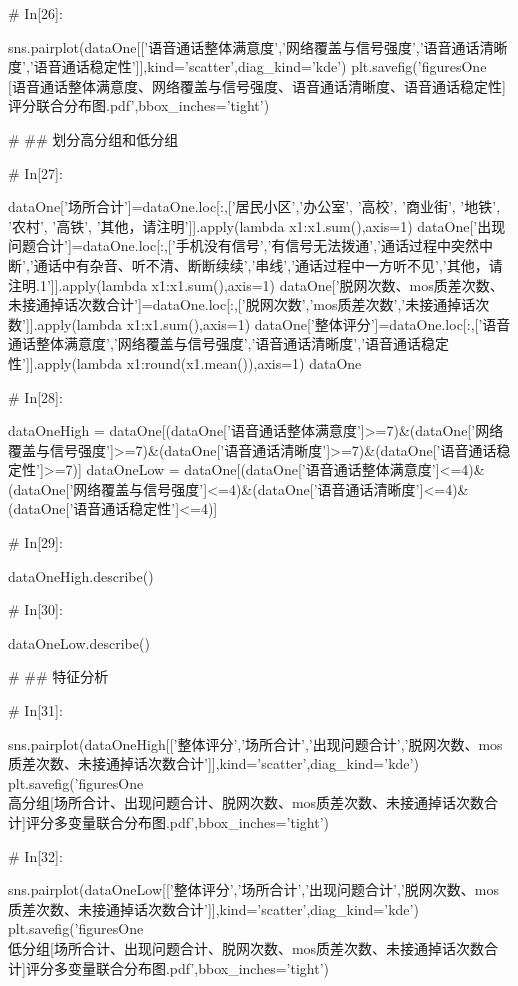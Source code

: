\documentclass{MathorCupmodeling}
\begin{document}
\begin{python}
# In[26]:


sns.pairplot(dataOne[['语音通话整体满意度','网络覆盖与信号强度','语音通话清晰度','语音通话稳定性']],kind='scatter',diag_kind='kde')
plt.savefig('figuresOne\\[附件1][语音通话整体满意度、网络覆盖与信号强度、语音通话清晰度、语音通话稳定性]评分联合分布图.pdf',bbox_inches='tight')


# ## 划分高分组和低分组

# In[27]:


dataOne['场所合计']=dataOne.loc[:,['居民小区','办公室', '高校', '商业街', '地铁', '农村', '高铁', '其他，请注明']].apply(lambda x1:x1.sum(),axis=1)
dataOne['出现问题合计']=dataOne.loc[:,['手机没有信号','有信号无法拨通','通话过程中突然中断','通话中有杂音、听不清、断断续续','串线','通话过程中一方听不见','其他，请注明.1']].apply(lambda x1:x1.sum(),axis=1)
dataOne['脱网次数、mos质差次数、未接通掉话次数合计']=dataOne.loc[:,['脱网次数','mos质差次数','未接通掉话次数']].apply(lambda x1:x1.sum(),axis=1)
dataOne['整体评分']=dataOne.loc[:,['语音通话整体满意度','网络覆盖与信号强度','语音通话清晰度','语音通话稳定性']].apply(lambda x1:round(x1.mean()),axis=1)
dataOne


# In[28]:


dataOneHigh = dataOne[(dataOne['语音通话整体满意度']>=7)&(dataOne['网络覆盖与信号强度']>=7)&(dataOne['语音通话清晰度']>=7)&(dataOne['语音通话稳定性']>=7)]
dataOneLow = dataOne[(dataOne['语音通话整体满意度']<=4)&(dataOne['网络覆盖与信号强度']<=4)&(dataOne['语音通话清晰度']<=4)&(dataOne['语音通话稳定性']<=4)]


# In[29]:


dataOneHigh.describe()


# In[30]:


dataOneLow.describe()


# ## 特征分析

# In[31]:


sns.pairplot(dataOneHigh[['整体评分','场所合计','出现问题合计','脱网次数、mos质差次数、未接通掉话次数合计']],kind='scatter',diag_kind='kde')
plt.savefig('figuresOne\\[附件1]高分组[场所合计、出现问题合计、脱网次数、mos质差次数、未接通掉话次数合计]评分多变量联合分布图.pdf',bbox_inches='tight')


# In[32]:


sns.pairplot(dataOneLow[['整体评分','场所合计','出现问题合计','脱网次数、mos质差次数、未接通掉话次数合计']],kind='scatter',diag_kind='kde')
plt.savefig('figuresOne\\[附件1]低分组[场所合计、出现问题合计、脱网次数、mos质差次数、未接通掉话次数合计]评分多变量联合分布图.pdf',bbox_inches='tight')



\end{python}
\end{document}
